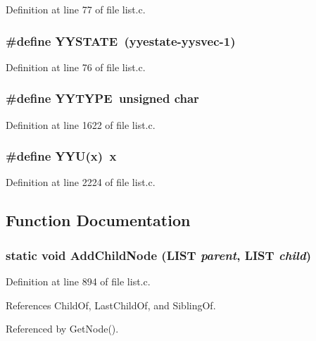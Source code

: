 Definition at line 77 of file list.c.
\subsubsection{\setlength{\rightskip}{0pt plus 5cm}\#define YYSTATE~(\bf{yyestate}-\bf{yysvec}-1)}\label{list_8c_32b5b960944f946b192d54f672569cd9}




Definition at line 76 of file list.c.
\subsubsection{\setlength{\rightskip}{0pt plus 5cm}\#define YYTYPE~unsigned char}\label{list_8c_f36e924ed81943536b70cc1b4247df25}




Definition at line 1622 of file list.c.
\subsubsection{\setlength{\rightskip}{0pt plus 5cm}\#define YYU(x)~x}\label{list_8c_94662a60a9be7f490003ed3f6dae26cc}




Definition at line 2224 of file list.c.

\subsection{Function Documentation}
\subsubsection{\setlength{\rightskip}{0pt plus 5cm}static void Add\-Child\-Node (\bf{LIST} {\em parent}, \bf{LIST} {\em child})\hspace{0.3cm}{\tt  [static]}}\label{list_8c_287edc7edce485b8735738ffcc5c332d}




Definition at line 894 of file list.c.

References Child\-Of, Last\-Child\-Of, and Sibling\-Of.

Referenced by Get\-Node().
